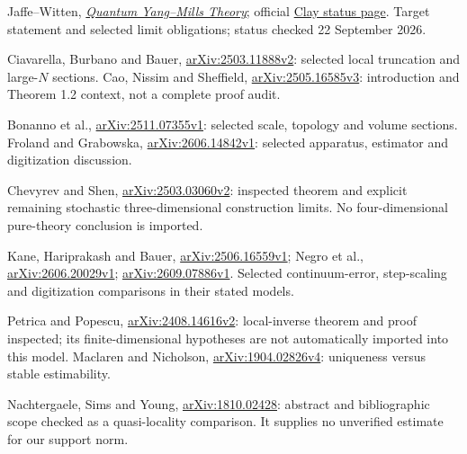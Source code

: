 \begin{enumerate}[label={[\arabic*]},itemsep=4pt]
\item Jaffe--Witten, \href{https://www.claymath.org/wp-content/uploads/2022/06/yangmills.pdf}{\emph{Quantum Yang--Mills Theory}}; official \href{https://www.claymath.org/millennium/yang-mills-the-maths-gap/}{Clay status page}. Target statement and selected limit obligations; status checked 22 September 2026.
\item Ciavarella, Burbano and Bauer, \href{https://arxiv.org/html/2503.11888v2}{arXiv:2503.11888v2}: selected local truncation and large-$N$ sections. Cao, Nissim and Sheffield, \href{https://arxiv.org/pdf/2505.16585v3}{arXiv:2505.16585v3}: introduction and Theorem 1.2 context, not a complete proof audit.
\item Bonanno et al., \href{https://arxiv.org/html/2511.07355v1}{arXiv:2511.07355v1}: selected scale, topology and volume sections. Froland and Grabowska, \href{https://arxiv.org/html/2606.14842v1}{arXiv:2606.14842v1}: selected apparatus, estimator and digitization discussion.
\item Chevyrev and Shen, \href{https://arxiv.org/pdf/2503.03060v2}{arXiv:2503.03060v2}: inspected theorem and explicit remaining stochastic three-dimensional construction limits. No four-dimensional pure-theory conclusion is imported.
\item Kane, Hariprakash and Bauer, \href{https://arxiv.org/html/2506.16559v1}{arXiv:2506.16559v1}; Negro et al., \href{https://arxiv.org/html/2606.20029v1}{arXiv:2606.20029v1}; \href{https://arxiv.org/html/2609.07886v1}{arXiv:2609.07886v1}. Selected continuum-error, step-scaling and digitization comparisons in their stated models.
\item Petrica and Popescu, \href{https://arxiv.org/html/2408.14616v2}{arXiv:2408.14616v2}: local-inverse theorem and proof inspected; its finite-dimensional hypotheses are not automatically imported into this model. Maclaren and Nicholson, \href{https://arxiv.org/abs/1904.02826v4}{arXiv:1904.02826v4}: uniqueness versus stable estimability.
\item Nachtergaele, Sims and Young, \href{https://arxiv.org/abs/1810.02428}{arXiv:1810.02428}: abstract and bibliographic scope checked as a quasi-locality comparison. It supplies no unverified estimate for our support norm.
\end{enumerate}
